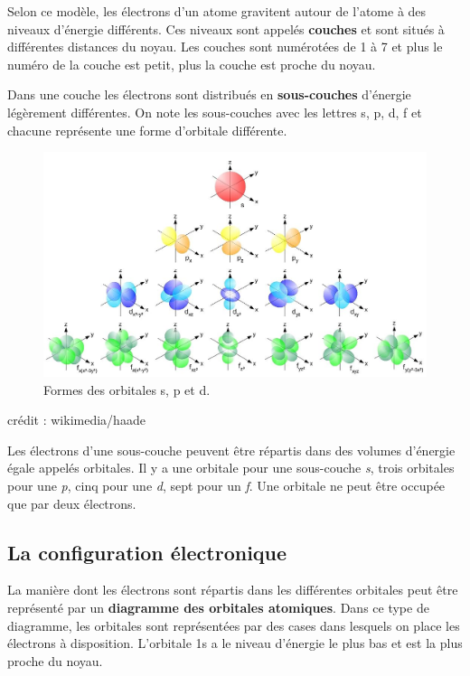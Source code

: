 \documentclass[
  11pt,
  french,
  a4paper,
  openany]{book}
\newenvironment{credit}
  {\vspace{-2em}\begin{center}\begin{footnotesize}\begin{textit}}
  {\end{textit}\end{footnotesize}\end{center}}
\begin{document}
Selon ce modèle, les électrons d'un atome gravitent autour de l'atome à des niveaux d'énergie différents. Ces niveaux sont appelés \textbf{couches} et sont situés à différentes distances du noyau. Les couches sont numérotées de 1 à 7 et plus le numéro de la couche est petit, plus la couche est proche du noyau.

Dans une couche les électrons sont distribués en \textbf{sous-couches} d'énergie légèrement différentes. On note les sous-couches avec les lettres s, p, d, f et chacune représente une forme d'orbitale différente.

\begin{figure}

{\centering \includegraphics[width=0.9\linewidth]{images/orb-3d} 

}

\caption{Formes des orbitales s, p et d.}\label{fig:orb-3d}
\end{figure}

\begin{credit}
crédit : wikimedia/haade

\end{credit}

Les électrons d'une sous-couche peuvent être répartis dans des volumes d'énergie égale appelés orbitales. Il y a une orbitale pour une sous-couche \emph{s}, trois orbitales pour une \emph{p}, cinq pour une \emph{d}, sept pour un \emph{f}. Une orbitale ne peut être occupée que par deux électrons.

\hypertarget{la-configuration-uxe9lectronique}{%
\subsection{La configuration électronique}\label{la-configuration-uxe9lectronique}}

La manière dont les électrons sont répartis dans les différentes orbitales peut être représenté par un \textbf{diagramme des orbitales atomiques}. Dans ce type de diagramme, les orbitales sont représentées par des cases dans lesquels on place les électrons à disposition. L'orbitale 1s a le niveau d'énergie le plus bas et est la plus proche du noyau.
\end{document}
